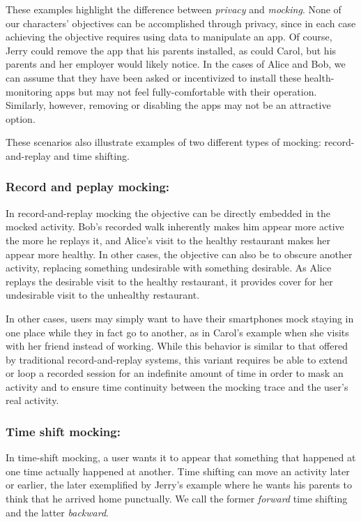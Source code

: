 These examples highlight the difference between \textit{privacy} and
\textit{mocking}. None of our characters' objectives can be accomplished
through privacy, since in each case achieving the objective requires using
data to manipulate an app. Of course, Jerry could remove the app that his
parents installed, as could Carol, but his parents and her employer would
likely notice. In the cases of Alice and Bob, we can assume that
they have been asked or incentivized to install these health-monitoring apps
but may not feel fully-comfortable with their operation. Similarly, however,
removing or disabling the apps may not be an attractive option. 

These scenarios also illustrate examples of two different types of
mocking: record-and-replay and time shifting.

\subsubsection{Record and peplay mocking:\space}

In record-and-replay mocking the objective can be directly embedded in the
mocked activity. Bob's recorded walk inherently makes him appear more active
the more he replays it, and Alice's visit to the healthy restaurant makes her
appear more healthy. In other cases, the objective can also be to obscure
another activity, replacing something undesirable with something desirable.
As Alice replays the desirable visit to the healthy restaurant, it provides
cover for her undesirable visit to the unhealthy restaurant.

In other cases, \PocketMocker{} users may simply want to have their smartphones
mock staying in one place while they in fact go to another, as in
Carol's example when she visits with her friend instead of working. While this
behavior is similar to that offered by traditional record-and-replay systems,
this variant requires \PocketMocker{} be able to extend or loop a recorded
session for an indefinite amount of time in order to mask an activity and to
ensure time continuity between the mocking trace and the user's real activity.

\subsubsection{Time shift mocking:\space}

In time-shift mocking, a user wants it to appear that something that happened
at one time actually happened at another. Time shifting can move an activity
later or earlier, the later exemplified by Jerry's example where he wants his
parents to think that he arrived home punctually. We call the former
\textit{forward} time shifting and the latter \textit{backward}.

